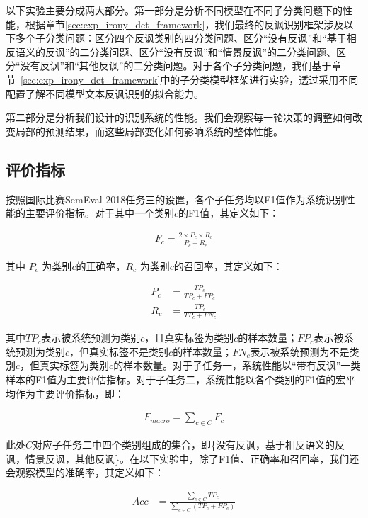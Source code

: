 以下实验主要分成两大部分。第一部分是分析不同模型在不同子分类问题下的性能，根据章节\ref{sec:exp_irony_det_framework}，我们最终的反讽识别框架涉及以下多个子分类问题：区分四个反讽类别的四分类问题、区分“没有反讽”和“基于相反语义的反讽”的二分类问题、区分“没有反讽”和“情景反讽”的二分类问题、区分“没有反讽”和“其他反讽”的二分类问题。对于各个子分类问题，我们基于章节~\ref{sec:exp_irony_det_framework}中的子分类模型框架进行实验，透过采用不同配置了解不同模型文本反讽识别的拟合能力。

第二部分是分析我们设计的识别系统的性能。我们会观察每一轮决策的调整如何改变局部的预测结果，而这些局部变化如何影响系统的整体性能。


\subsection{评价指标}

按照国际比赛SemEval-2018任务三的设置，各个子任务均以F1值作为系统识别性能的主要评价指标。对于其中一个类别$c$的F1值，其定义如下：

\begin{align}
  F_c = \frac{2 \times P_c \times R_c}{P_c + R_c} 
\end{align}

其中 $P_c$ 为类别$c$的正确率，$R_c$ 为类别$c$的召回率，其定义如下：

\begin{align}
  P_c &= \frac{TP_c}{TP_c + FP_c} \\
  R_c &= \frac{TP_c}{TP_c + FN_c}
\end{align} 

其中$TP_c$表示被系统预测为类别$c$，且真实标签为类别$c$的样本数量；$FP_c$表示被系统预测为类别$c$，但真实标签不是类别$c$的样本数量；$FN_c$表示被系统预测为不是类别$c$，但真实标签为类别$c$的样本数量。对于子任务一，系统性能以“带有反讽”一类样本的F1值为主要评估指标。对于子任务二，系统性能以各个类别的F1值的宏平均作为主要评价指标，即：

\begin{align}
  F_{macro} = \sum\limits_{c \in C}F_c
\end{align}

此处$C$对应子任务二中四个类别组成的集合，即\{没有反讽，基于相反语义的反讽，情景反讽，其他反讽\}。在以下实验中，除了F1值、正确率和召回率，我们还会观察模型的准确率，其定义如下：

\begin{align}
  Acc &= \frac{\sum\limits_{c \in C} TP_c}{\sum\limits_{c \in C}(TP_c + FP_c)}
\end{align}

